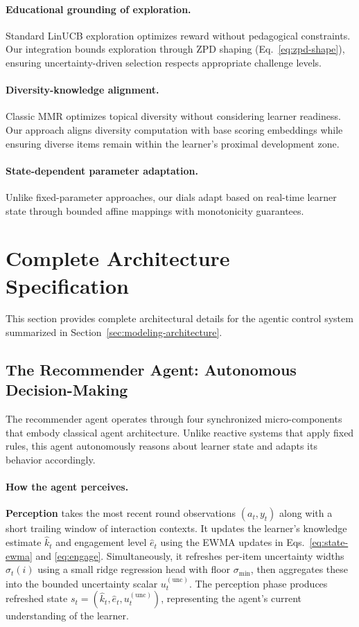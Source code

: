 \paragraph{Educational grounding of exploration.} Standard LinUCB exploration optimizes reward without pedagogical constraints. Our integration bounds exploration through ZPD shaping (Eq.~\ref{eq:zpd-shape}), ensuring uncertainty-driven selection respects appropriate challenge levels.

\paragraph{Diversity-knowledge alignment.} Classic MMR optimizes topical diversity without considering learner readiness. Our approach aligns diversity computation with base scoring embeddings while ensuring diverse items remain within the learner's proximal development zone.

\paragraph{State-dependent parameter adaptation.} Unlike fixed-parameter approaches, our dials adapt based on real-time learner state through bounded affine mappings with monotonicity guarantees.

\section{Complete Architecture Specification}
\label{app:architecture-details}

This section provides complete architectural details for the agentic control system summarized in Section~\ref{sec:modeling-architecture}.

\subsection{The Recommender Agent: Autonomous Decision-Making}
\label{subsec:arch-agents-detailed}
The recommender agent operates through four synchronized micro-components that embody classical agent architecture. Unlike reactive systems that apply fixed rules, this agent autonomously reasons about learner state and adapts its behavior accordingly.

\paragraph{How the agent perceives.} \textbf{Perception} takes the most recent round observations \((a_t,y_t)\) along with a short trailing window of interaction contexts. It updates the learner's knowledge estimate \(\widehat{k}_t\) and engagement level \(\widehat{e}_t\) using the EWMA updates in Eqs.~\eqref{eq:state-ewma} and \eqref{eq:engage}. Simultaneously, it refreshes per-item uncertainty widths \(\sigma_t(i)\) using a small ridge regression head with floor \(\sigma_{\min}\), then aggregates these into the bounded uncertainty scalar \(u_t^{(\mathrm{unc})}\). The perception phase produces refreshed state \(s_t=(\widehat{k}_t,\widehat{e}_t,u_t^{(\mathrm{unc})})\), representing the agent's current understanding of the learner.

